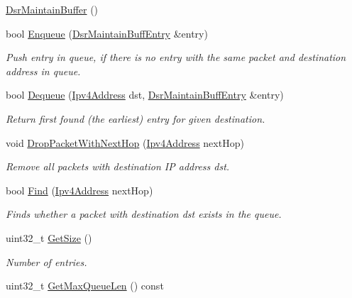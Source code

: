 \begin{DoxyCompactItemize}
\item 
\hyperlink{classns3_1_1dsr_1_1DsrMaintainBuffer_a89df4c4059c2290fd6f528bce2fa92e9}{Dsr\+Maintain\+Buffer} ()
\item 
bool \hyperlink{classns3_1_1dsr_1_1DsrMaintainBuffer_a8ec30b5b9b0f6af36e61867327a47717}{Enqueue} (\hyperlink{classns3_1_1dsr_1_1DsrMaintainBuffEntry}{Dsr\+Maintain\+Buff\+Entry} \&entry)
\begin{DoxyCompactList}\small\item\em Push entry in queue, if there is no entry with the same packet and destination address in queue. \end{DoxyCompactList}\item 
bool \hyperlink{classns3_1_1dsr_1_1DsrMaintainBuffer_a0539c5c6c2b05e10f52372f5fdb93c06}{Dequeue} (\hyperlink{classns3_1_1Ipv4Address}{Ipv4\+Address} dst, \hyperlink{classns3_1_1dsr_1_1DsrMaintainBuffEntry}{Dsr\+Maintain\+Buff\+Entry} \&entry)
\begin{DoxyCompactList}\small\item\em Return first found (the earliest) entry for given destination. \end{DoxyCompactList}\item 
void \hyperlink{classns3_1_1dsr_1_1DsrMaintainBuffer_a1a9e6b160691cf12dc785dbf91a2fc32}{Drop\+Packet\+With\+Next\+Hop} (\hyperlink{classns3_1_1Ipv4Address}{Ipv4\+Address} next\+Hop)
\begin{DoxyCompactList}\small\item\em Remove all packets with destination IP address dst. \end{DoxyCompactList}\item 
bool \hyperlink{classns3_1_1dsr_1_1DsrMaintainBuffer_a42eaded41fd2aeb05dbf0261a130281a}{Find} (\hyperlink{classns3_1_1Ipv4Address}{Ipv4\+Address} next\+Hop)
\begin{DoxyCompactList}\small\item\em Finds whether a packet with destination dst exists in the queue. \end{DoxyCompactList}\item 
uint32\+\_\+t \hyperlink{classns3_1_1dsr_1_1DsrMaintainBuffer_a7df015a7d740c8b442df20f4ab3895b7}{Get\+Size} ()
\begin{DoxyCompactList}\small\item\em Number of entries. \end{DoxyCompactList}\item 
uint32\+\_\+t \hyperlink{classns3_1_1dsr_1_1DsrMaintainBuffer_abcac71bd02b5e93fc1ecfec42f081ec2}{Get\+Max\+Queue\+Len} () const 

\end{DoxyCompactItemize}
